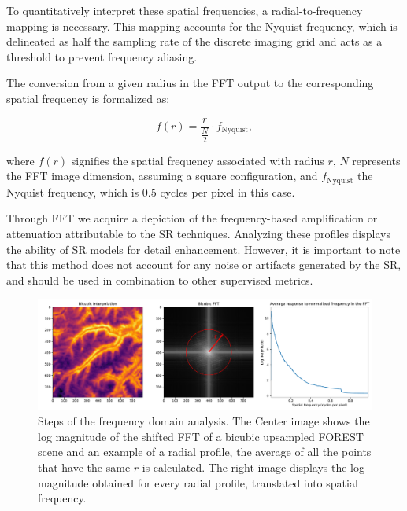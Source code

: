         To quantitatively interpret these spatial frequencies, a radial-to-frequency mapping is necessary. This mapping accounts for the Nyquist frequency, which is delineated as half the sampling rate of the discrete imaging grid and acts as a threshold to prevent frequency aliasing.

        The conversion from a given radius in the FFT output to the corresponding spatial frequency is formalized as:

        \begin{equation}
            f(r) = \frac{r}{\frac{N}{2}} \cdot f_{\text{Nyquist}},
        \end{equation}

        where \( f(r) \) signifies the spatial frequency associated with radius \( r \), \( N \) represents the FFT image dimension, assuming a square configuration, and \( f_{\text{Nyquist}} \) the Nyquist frequency, which is 0.5 cycles per pixel in this case.

        Through FFT we acquire a depiction of the frequency-based amplification or attenuation attributable to the SR techniques. Analyzing these profiles displays the ability of SR models for detail enhancement. However, it is important to note that this method does not account for any noise or artifacts generated by the SR, and should be used in combination to other supervised metrics.

        \begin{figure}[h!]
            \centering
            \includegraphics[width=\linewidth]{Includes/4-frequency-analysis.pdf}
            \caption{Steps of the frequency domain analysis. The Center image shows the log magnitude of the shifted FFT of a bicubic upsampled FOREST scene and an example of a radial profile, the average of all the points that have the same $r$ is calculated. The right image displays the log magnitude obtained for every radial profile, translated into spatial frequency.  }
            \label{fig:4-frequency-analysis}
        \end{figure}

